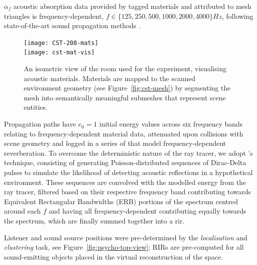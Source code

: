 $\alpha_f$ acoustic absorption data provided by tagged materials and attributed to mesh triangles is frequency-dependent, $f \in \{ 125, 250, 500, 1000, 2000, 4000 \}Hz$, following state-of-the-art sound propagation methods \citep{schissler2017acoustic}.\par
\begin{figure}[htbp]
    \centering
    \texttt{[image: CST-208-mats]} \\
    \texttt{[image: cst-mat-vis]}
    \caption{An isometric view of the room used for the experiment, visualising acoustic materials. Materials are mapped to the scanned environment geometry (see Figure~\ref{fig:cst-mesh}) by segmenting the mesh into semantically meaningful submeshes that represent scene entities.}
    \label{fig:cst-208-materials}
\end{figure}
Propagation paths have $e_0 = 1$ initial energy values across six frequency bands relating to frequency-dependent material data, attenuated upon collisions with scene geometry and logged in a series of  that model frequency-dependent reverberation. To overcome the deterministic nature of the ray tracer, we adopt \cite{schroder2011physically}'s technique, consisting of generating Poisson-distributed sequences of Dirac-Delta pulses to simulate the likelihood of detecting acoustic reflections in a hypothetical environment. These sequences are convolved with the modelled energy from the ray tracer, filtered based on their respective frequency band contributing towards Equivalent Rectangular Bandwidths (ERB) portions of the spectrum centred around each $f$ and having all frequency-dependent  contributing equally towards the spectrum, which are finally summed together into a \acrshort{rir}.\par
Listener and sound source positions were pre-determined by the \emph{localisation} and \emph{clustering} task, see Figure~\ref{fig:psycho-top-view}; RIRs are pre-computed for all sound-emitting objects placed in the virtual reconstruction of the space.

